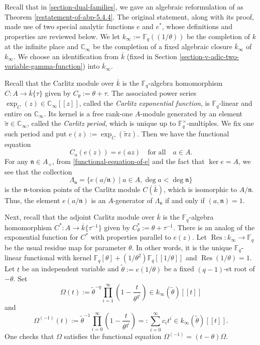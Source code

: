 \documentclass[11pt]{amsart}
\theoremstyle{plain}
\theoremstyle{definition}
\theoremstyle{remark}
\numberwithin{equation}{section}
\newcommand{\CC}{\mathbb{C}}
\newcommand{\FF}{\mathbb{F}}
\newcommand{\nfk}{\mathfrak{n}}
\newcommand{\Res}{\operatorname{Res}}
\newcommand{\ovl}{\overline}
\newcommand{\td}{\tilde}
\newcommand{\Fq}{\FF_q}
\newcommand{\Fqst}{\FF_q^\times}
\newcommand{\T}{\theta}
\begin{document}
	Recall that in \ref{section-dual-families}, we gave an algebraic reformulation of \cite[Theorem 5.4.4]{abp2004determination} as Theorem \ref{restatement-of-abp-5.4.4}.
	The original statement, along with its proof, made use of two special analytic functions $e$ and $e^*$, whose definitions and properties are reviewed below.
	We let $k_\infty := \Fq(\!(1/\T)\!)$ be the completion of $k$ at the infinite place and $\CC_\infty$ be the completion of a fixed algebraic closure $\ovl{k}_\infty$ of $k_\infty$.
	We choose an identification from $\ovl{k}$ (fixed in Section \ref{section-v-adic-two-variable-gamma-function}) into $\ovl{k}_\infty$.
	
	Recall that the Carlitz module over $\ovl{k}$ is the $\Fq$-algebra homomorphism $C: A \to \ovl{k}\{\tau\}$ given by $C_\T := \T + \tau$.
	The associated power series $\exp_C(z) \in \CC_\infty[\![z]\!]$, called the \textit{Carlitz exponential function}, is $\Fq$-linear and entire on $\CC_\infty$.
	Its kernel is a free rank-one $A$-module generated by an element $\td{\pi} \in\CC_\infty$, called the \textit{Carlitz period}, which is unique up to $\Fqst$-multiples.
	We fix one such period and put $e(z) := \exp_C(\td{\pi}z)$.
	Then we have the functional equation
	\begin{equation}    \label{functional-equation-of-e}
		C_a(e(z)) = e(az)
		\quad
		\text{for all}
		\quad
		a \in A.
	\end{equation}
	For any $\nfk \in A_+$, from \eqref{functional-equation-of-e} and the fact that $\ker e= A$, we see that the collection
	$$
	\Lambda_\nfk = \{ e(a/\nfk) \mid a \in A, \deg a < \deg \nfk \}
	$$
	is the $\nfk$-torsion points of the Carlitz module $C(\ovl{k})$, which is isomorphic to $A/\nfk$. 
	Thus, the element $e(a/\nfk)$ is an $A$-generator of $\Lambda_{\nfk}$ if and only if $(a,\nfk)=1$.
	
	Next, recall that the adjoint Carlitz module over $\ovl{k}$ is the $\Fq$-algebra homomorphism $C^*: A \to \ovl{k}\{\tau^{-1}\}$ given by $C^*_\T := \T + \tau^{-1}$.
	There is an analog of the exponential function for $C^*$ with properties parallel to $e(z)$.
	Let $\Res: k_\infty \to \Fq$ be the usual residue map for parameter $\T$. In other words, it is the unique $\Fq$-linear functional with kernel $\Fq[\T] + (1/\T^2)\Fq[\![1/\T]\!]$ and $\Res(1/\T) = 1$.
	Let $t$ be an independent variable and $\td{\T} := e(1/\T)$ be a fixed $(q-1)$-st root of $-\T$.
	Set
	$$
	\Omega(t) := \td{\T}^{-q} \prod_{i=1}^\infty \left( 1-\frac{t}{\T^{q^i}} \right)
	\in k_\infty(\td{\T}) [\![t]\!]
	$$
	and
	$$
	\Omega^{(-1)}(t) := \td{\T}^{-1} \prod_{i=0}^\infty \left( 1-\frac{t}{\T^{q^i}} \right) =: \sum_{i=0}^\infty c_it^i
	\in k_\infty(\td{\T}) [\![t]\!].
	$$
	One checks that $\Omega$ satisfies the functional equation $\Omega^{(-1)} = (t-\T) \Omega$.
	
\end{document}
